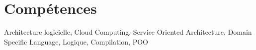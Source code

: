 \section{Comp\'etences}
Architecture logicielle, Cloud Computing, Service Oriented Architecture, Domain Specific Language, Logique, Compilation, POO
